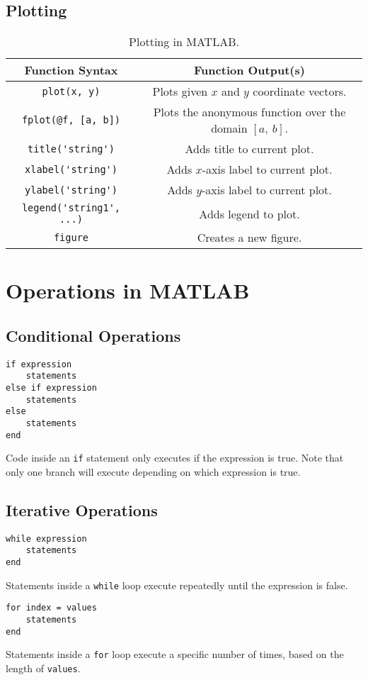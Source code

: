 \documentclass{article}
\begin{document}
\subsection{Plotting}
\begin{table}[H]
    \centering
    \begin{tabular}{c | c}
        \toprule
        Function Syntax & Function Output(s) \\
        \midrule
        \lstinline!plot(x, y)! & Plots given $x$ and $y$ coordinate vectors. \\
        \lstinline!fplot(@f, [a, b])! & Plots the anonymous function over the domain $\left[ a,\: b \right]$. \\
        \lstinline!title('string')! & Adds title to current plot. \\
        \lstinline!xlabel('string')! & Adds $x$-axis label to current plot. \\
        \lstinline!ylabel('string')! & Adds $y$-axis label to current plot. \\
        \lstinline!legend('string1', ...)! & Adds legend to plot. \\
        \lstinline!figure! & Creates a new figure. \\
        \bottomrule
    \end{tabular}
    \caption{Plotting in MATLAB.}
\end{table}
\section{Operations in MATLAB}
\subsection{Conditional Operations}
\begin{multicols}{2}
    \begin{lstlisting}
if expression
    statements
else if expression
    statements
else
    statements
end
    \end{lstlisting}
    \columnbreak
    Code inside an \lstinline{if} statement only executes if the expression is true. Note that only one branch will execute depending on which expression is true.
\end{multicols}
\subsection{Iterative Operations}
\begin{multicols}{2}
    \begin{lstlisting}
while expression
    statements
end
    \end{lstlisting}
    \columnbreak
    Statements inside a \lstinline{while} loop \linebreak execute repeatedly until the expression is false.
\end{multicols}
\begin{multicols}{2}
    \begin{lstlisting}
for index = values
    statements
end
    \end{lstlisting}
    \columnbreak
    Statements inside a \lstinline{for} loop execute a specific number of times, based on the length of \lstinline{values}.
\end{multicols}
\end{document}
